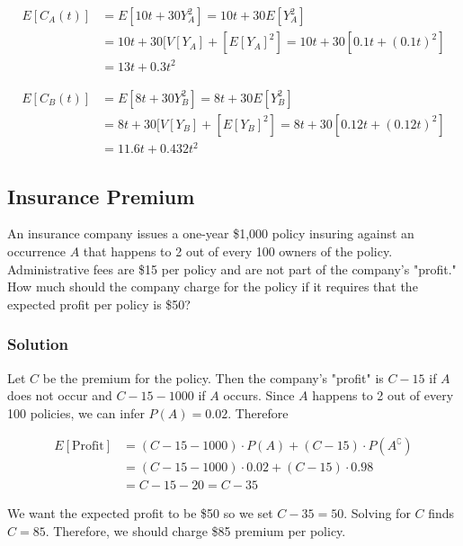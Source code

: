 \documentclass[11pt]{article}
\theoremstyle{definition}
\begin{document}
$$
	\begin{aligned}
		E[C_A(t)] & = E[10t + 30Y_A^2] = 10t + 30E[Y_A^2] \\
		& = 10t + 30[V[Y_A] + [E[Y_A]^2] = 10t + 30[0.1t + (0.1t)^2] \\
		& = 13t + 0.3t^2
	\end{aligned}
$$

$$
	\begin{aligned}
		E[C_B(t)] & = E[8t + 30Y_B^2] = 8t + 30E[Y_B^2] \\
		& =8t + 30[V[Y_B] + [E[Y_B]^2] = 8t + 30[0.12t + (0.12t)^2] \\
		& = 11.6t + 0.432t^2
	\end{aligned}
$$

\subsection{Insurance Premium}

An insurance company issues a one-year \$1,000 policy insuring against an occurrence $A$ that happens to 2 out of every 100 owners of the policy. Administrative fees are \$15 per policy and are not part of the company's "profit." How much should the company charge for the policy if it requires that the expected profit per policy is \$50?

\subsubsection*{Solution}

Let $C$ be the premium for the policy. Then the company's "profit" is $C-15$ if $A$ does not occur and $C-15-1000$ if $A$ occurs. Since $A$ happens to 2 out of every 100 policies, we can infer $P(A)=0.02$. Therefore

$$
	\begin{aligned}
		E[\text{Profit}] & = (C - 15 - 1000) \cdot P(A) + (C - 15) \cdot P(A^\complement) \\
		& = (C - 15 - 1000) \cdot 0.02 + (C - 15) \cdot 0.98 \\
		& = C - 15 - 20 = C - 35
	\end{aligned}
$$

We want the expected profit to be \$50 so we set $C - 35 = 50$. Solving for $C$ finds $C = 85$. Therefore, we should charge \$85 premium per policy.
\end{document}
